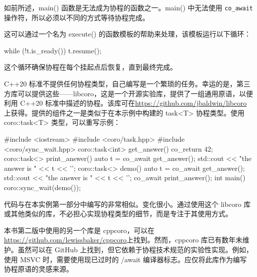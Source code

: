 如前所述，main() 函数是无法成为协程的函数之一。main() 中无法使用 \verb|co_await| 操作符，所以必须以不同的方式等待协程完成。

这可以通过一个名为 execute() 的函数模板的帮助来处理，该模板运行以下循环：

\begin{cpp}
while (!t.is_ready()) t.resume();
\end{cpp}

这个循环确保协程在每个挂起点后恢复，直到最终完成。


C++20 标准不提供任何协程类型，自己编写是一个繁琐的任务。幸运的是，第三方库可以提供这些——libcoro，这是一个开源实验库，提供了一组通用原语，以便利用 C++20 标准中描述的协程。该库可在\url{https://github.com/jbaldwin/libcoro}上获得。提供的组件之一是类似于在本示例中构建的 task<T> 协程类型。使用 coro::task<T> 类型，可以重写示例：

\begin{cpp}
#include <iostream>
#include <coro/task.hpp>
#include <coro/sync_wait.hpp>
coro::task<int> get_answer()
{
    co_return 42;
}
coro::task<> print_answer()
{
    auto t = co_await get_answer();
    std::cout << "the answer is " << t << '\n';
}
coro::task<> demo()
{
    auto t = co_await get_answer();
    std::cout << "the answer is " << t << '\n';
    co_await print_answer();
}
int main()
{
    coro::sync_wait(demo());
}
\end{cpp}

代码与在本实例第一部分中编写的非常相似。变化很小。通过使用这个 libcoro 库或其他类似的库，不必担心实现协程类型的细节，而是专注于其使用方式。

\begin{myNotic}
本书第二版中使用的另一个库是 cppcoro，可以在 \url{https://github.com/lewissbaker/cppcoro}上找到。然而，cppcoro 库已有数年未维护。虽然可以在 GitHub 上找到，但它依赖于协程技术规范的实验性实现。例如，使用 MSVC 时，需要使用现已过时的 /await 编译器标志。应仅将此库作为编写协程原语的灵感来源。
\end{myNotic}







